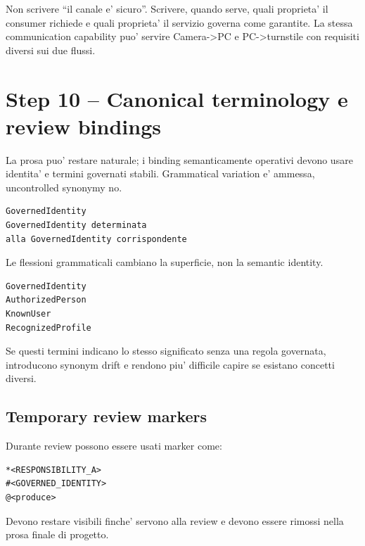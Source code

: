 \documentclass[11pt,a4paper]{article}
\begin{document}
\begin{reviewbox}
Non scrivere ``il canale e' sicuro''. Scrivere, quando serve, quali proprieta' il consumer richiede e quali proprieta' il servizio governa come garantite. La stessa communication capability puo' servire Camera->PC e PC->turnstile con requisiti diversi sui due flussi.
\end{reviewbox}

\section{Step 10 -- Canonical terminology e review bindings}

\begin{statusclosed}
La prosa puo' restare naturale; i binding semanticamente operativi devono usare identita' e termini governati stabili. Grammatical variation e' ammessa, uncontrolled synonymy no.
\end{statusclosed}

\begin{goodbox}
\begin{lstlisting}
GovernedIdentity
GovernedIdentity determinata
alla GovernedIdentity corrispondente
\end{lstlisting}
Le flessioni grammaticali cambiano la superficie, non la semantic identity.
\end{goodbox}

\begin{badbox}
\begin{lstlisting}
GovernedIdentity
AuthorizedPerson
KnownUser
RecognizedProfile
\end{lstlisting}
Se questi termini indicano lo stesso significato senza una regola governata, introducono synonym drift e rendono piu' difficile capire se esistano concetti diversi.
\end{badbox}

\subsection{Temporary review markers}

Durante review possono essere usati marker come:

\begin{lstlisting}
*<RESPONSIBILITY_A>
#<GOVERNED_IDENTITY>
@<produce>
\end{lstlisting}

Devono restare visibili finche' servono alla review e devono essere rimossi nella prosa finale di progetto.
\end{document}
